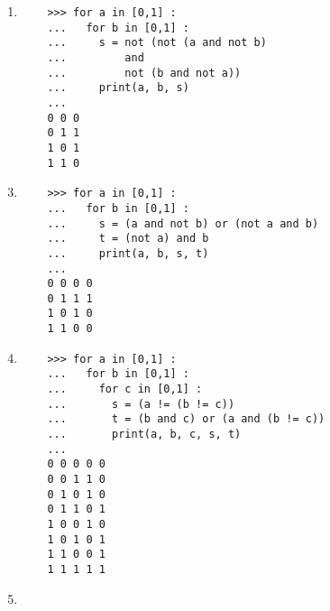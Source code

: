 \begin{description}
\begin{minipage}[t]{7.5cm}
\begin{enumerate}
	\begin{py}{12cm}
	\begin{verbatim}
	>>> for a in [0,1] :
	...   for b in [0,1] :
	...     for c in [0,1] :
	...       s = (a and not b) or 
	...           (b and not a)
	...       print(a, b, c, s)
	... 
	0 0 0 0
	0 0 1 0
	0 1 0 1
	0 1 1 1
	1 0 0 1
	1 0 1 1
	1 1 0 0
	1 1 1 0
	\end{verbatim}
	\end{py}

	\item
	
	\begin{py}{12cm}
	\begin{verbatim}
	>>> for a in [0,1] :
	...   for b in [0,1] :
	...     s = not (not (a and not b) 
	...         and 
	...         not (b and not a))
	...     print(a, b, s)
	... 
	0 0 0
	0 1 1
	1 0 1
	1 1 0
	\end{verbatim}
	\end{py}
	\end{enumerate}
	\end{minipage}
	\hfill
	\begin{minipage}[t]{7.5cm}
	\begin{enumerate}\setcounter{enumi}{2}
	\item
	
	\begin{py}{12cm}
	\begin{verbatim}
	>>> for a in [0,1] :
	...   for b in [0,1] :
	...     s = (a and not b) or (not a and b)
	...     t = (not a) and b
	...     print(a, b, s, t)
	... 
	0 0 0 0
	0 1 1 1
	1 0 1 0
	1 1 0 0
	\end{verbatim}
	\end{py}

	\item
	
	\begin{py}{12cm}
	\begin{verbatim}
	>>> for a in [0,1] :
	...   for b in [0,1] :
	...     for c in [0,1] :
	...       s = (a != (b != c))
	...       t = (b and c) or (a and (b != c))
	...       print(a, b, c, s, t)
	...
	0 0 0 0 0
	0 0 1 1 0
	0 1 0 1 0
	0 1 1 0 1
	1 0 0 1 0
	1 0 1 0 1
	1 1 0 0 1
	1 1 1 1 1
	\end{verbatim}
	\end{py}
	\end{enumerate}
	\end{minipage}

	\begin{minipage}[t]{7.5cm}
	\begin{enumerate}\setcounter{enumi}{4}
	\item
	

\end{enumerate}
\end{minipage}
\end{description}
